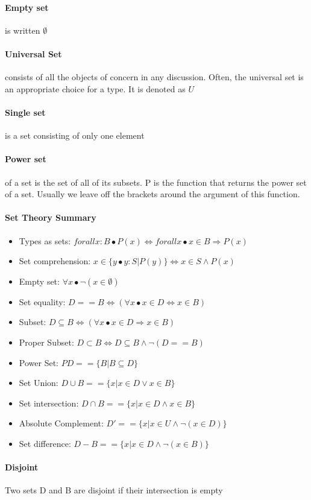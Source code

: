     \paragraph{Empty set} is written $\emptyset$

    \paragraph{Universal Set} consists of all the objects of concern in any
    discussion. Often, the universal set is an appropriate choice for a type.
    It is denoted as $U$

    \paragraph{Single set} is a set consisting of only one element

    \paragraph{Power set} of a set is the set of all of its subsets. P is the
    function that returns the power set of a set. Usually we leave off the
    brackets around the argument of this function.

    \paragraph{Set Theory Summary}
    \begin{itemize}
      \item Types as sets: $ forall x : B \bullet P(x) \Leftrightarrow forall x
        \bullet x \in B \Rightarrow P(x) $
      \item Set comprehension: $ x \in \{ y \bullet y : S | P(y) \}
        \Leftrightarrow x \in S \land P(x) $
      \item Empty set: $ \forall x \bullet \lnot ( x \in \emptyset ) $
      \item Set equality: $ D == B \Leftrightarrow ( \forall x \bullet x \in D
        \Leftrightarrow x \in B ) $
      \item Subset: $ D \subseteq B \Leftrightarrow ( \forall x \bullet x \in D
        \Rightarrow x \in B ) $
      \item Proper Subset: $ D \subset B \Leftrightarrow D \subseteq B \land
        \lnot ( D == B ) $
      \item Power Set: $ PD == \{ B | B \subseteq D \} $
      \item Set Union: $ D \cup B == \{ x | x \in D \lor x \in B \} $
      \item Set intersection: $ D \cap B == \{ x | x \in D \land x \in B \} $
      \item Absolute Complement: $D' == \{ x | x \in U \land \lnot ( x \in D )
        \} $
      \item Set difference: $ D - B == \{ x | x \in D \land \lnot ( x \in B )
        \} $
    \end{itemize}

    \paragraph{Disjoint} Two sets D and B are disjoint if their intersection is
    empty
